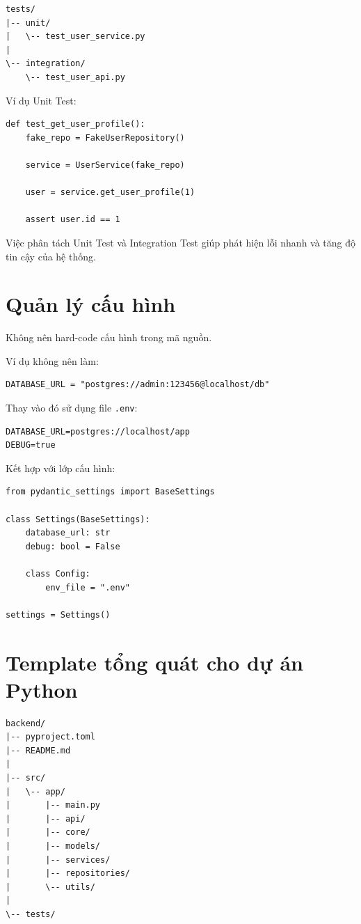 \documentclass[12pt,a4paper]{article}
\begin{document}
\begin{lstlisting}
tests/
|-- unit/
|   \-- test_user_service.py
|
\-- integration/
    \-- test_user_api.py
\end{lstlisting}

Ví dụ Unit Test:

\begin{lstlisting}
def test_get_user_profile():
    fake_repo = FakeUserRepository()

    service = UserService(fake_repo)

    user = service.get_user_profile(1)

    assert user.id == 1
\end{lstlisting}

Việc phân tách Unit Test và Integration Test giúp phát hiện lỗi nhanh và tăng độ tin cậy của hệ thống.

\section{Quản lý cấu hình}

Không nên hard-code cấu hình trong mã nguồn.

Ví dụ không nên làm:

\begin{lstlisting}
DATABASE_URL = "postgres://admin:123456@localhost/db"
\end{lstlisting}

Thay vào đó sử dụng file \texttt{.env}:

\begin{lstlisting}
DATABASE_URL=postgres://localhost/app
DEBUG=true
\end{lstlisting}

Kết hợp với lớp cấu hình:

\begin{lstlisting}
from pydantic_settings import BaseSettings

class Settings(BaseSettings):
    database_url: str
    debug: bool = False

    class Config:
        env_file = ".env"

settings = Settings()
\end{lstlisting}

\section{Template tổng quát cho dự án Python}

\begin{lstlisting}
backend/
|-- pyproject.toml
|-- README.md
|
|-- src/
|   \-- app/
|       |-- main.py
|       |-- api/
|       |-- core/
|       |-- models/
|       |-- services/
|       |-- repositories/
|       \-- utils/
|
\-- tests/
\end{lstlisting}
\end{document}
